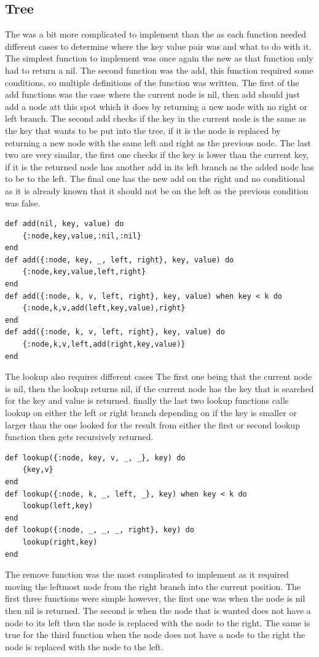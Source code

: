 \documentclass[a4paper,11pt]{article}
\begin{document}
\subsection*{Tree}
The was a bit more complicated to implement than the as each function needed different cases to determine where the key value pair was and what to do with it. The simplest function to implement was once again the new as that function only had to return a nil. The second function was the add, this function required some conditions, so multiple definitions of the function was written. The first of the add functions was the case where the current node is nil, then add should just add a node att this spot which it does by returning a new node with no right or left branch. 
The second add checks if the key in the current node is the same as the key that wants to be put into the tree, if it is the node is replaced by returning a new node with the same left and right as the previous node. The last two are very similar, the first one checks if the key is lower than the current key, if it is the returned node has another add in its left branch as the added node has to be to the left. The final one has the new add on the right and no conditional as it is already known that it should not be on the left as the previous condition was false.
\begin{verbatim}
def add(nil, key, value) do
    {:node,key,value,:nil,:nil}
end
def add({:node, key, _, left, right}, key, value) do
    {:node,key,value,left,right}
end
def add({:node, k, v, left, right}, key, value) when key < k do
    {:node,k,v,add(left,key,value),right}
end
def add({:node, k, v, left, right}, key, value) do
    {:node,k,v,left,add(right,key,value)}
end
\end{verbatim}
The lookup also requires different cases The first one being that the current node is nil, then the lookup returns nil, if the current node has the key that is searched for the key and value is returned. finally the last two lookup functions calls lookup on either the left or right branch depending on if the key is smaller or larger than the one looked for the result from either the first or second lookup function then gets recursively returned.
\begin{verbatim}
def lookup({:node, key, v, _, _}, key) do
    {key,v}
end
def lookup({:node, k, _, left, _}, key) when key < k do
    lookup(left,key)
end
def lookup({:node, _, _, _, right}, key) do
    lookup(right,key)
end
\end{verbatim}
The remove function was the most complicated to implement as it required moving the leftmost node from the right branch into the current position. The first three functions were simple however, the first one was when the node is nil then nil is returned. The second is when the node that is wanted does not have a node to its left then the node is replaced with the node to the right. The same is true for the third function when the node does not have a node to the right the node is replaced with the node to the left.
\end{document}
